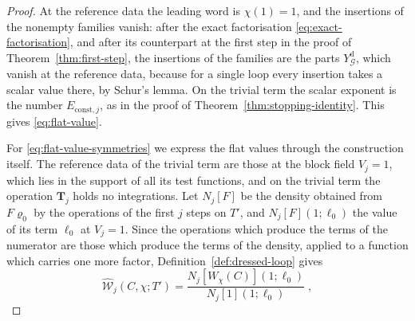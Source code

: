 \documentclass[11pt]{preprint}
\numberwithin{equation}{section}
\theoremstyle{definition}
\theoremstyle{remark}
\theoremstyle{plain}
\begin{document}
\begin{proof}
At the reference data the leading word is $\chi(1) = 1$, and the insertions of the nonempty families vanish: after the exact factorisation \eqref{eq:exact-factorisation}, and after its counterpart at the first step in the proof of Theorem~\ref{thm:first-step}, the insertions of the families are the parts $Y^{\mathrm d}_{\mathcal G}$, which vanish at the reference data, because for a single loop every insertion takes a scalar value there, by Schur's lemma. On the trivial term the scalar exponent is the number $E_{\mathrm{const},j}$, as in the proof of Theorem~\ref{thm:stopping-identity}. This gives \eqref{eq:flat-value}.

For \eqref{eq:flat-value-symmetries} we express the flat values through the construction itself. The reference data of the trivial term are those at the block field $V_j = 1$, which lies in the support of all its test functions, and on the trivial term the operation $\mathbf T_j$ holds no integrations. Let $N_j[F]$ be the density obtained from $F\varrho_0$ by the operations of the first $j$ steps on $T'$, and $N_j[F](1; \ell_0)$ the value of its term $\ell_0$ at $V_j = 1$. Since the operations which produce the terms of the numerator are those which produce the terms of the density, applied to a function which carries one more factor, Definition~\ref{def:dressed-loop} gives
\begin{equation}\label{eq:flat-value-ratio}
    \widehat{\mathcal W}_j(C, \chi; T') = \frac{N_j[W_\chi(C)](1; \ell_0)}{N_j[1](1; \ell_0)}\;,
\end{equation}

\end{proof}
\end{document}
